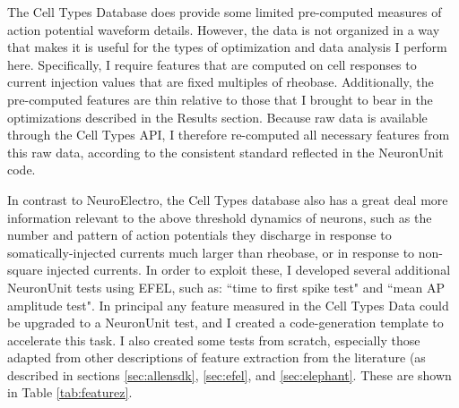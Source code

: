 The Cell Types Database does provide some limited pre-computed measures of action potential waveform details. 
However, the data is not organized in a way that makes it is useful for the types of optimization and data analysis I perform here.
Specifically, I require features that are computed on cell responses to current injection values that are fixed multiples of rheobase.
Additionally, the pre-computed features are thin relative to those that I brought to bear in the optimizations described in the Results section.
Because raw data is available through the Cell Types API, I therefore re-computed all necessary features from this raw data, according to the consistent standard reflected in the NeuronUnit code.

In contrast to NeuroElectro, the Cell Types database also has a great deal more information relevant to the above threshold dynamics of neurons, such as the number and pattern of action potentials they discharge in response to somatically-injected currents much larger than rheobase, or in response to non-square injected currents.
In order to exploit these, I developed several additional NeuronUnit tests using EFEL, such as: ``time to first spike test" and ``mean AP amplitude test". In principal any feature measured in the Cell Types Data could be upgraded to a NeuronUnit test, and I created a code-generation template to accelerate this task.
I also created some tests from scratch, especially those adapted from other descriptions of feature extraction from the literature (as described in sections \ref{sec:allensdk}, \ref{sec:efel}, and \ref{sec:elephant}. These are shown in Table \ref{tab:featurez}.


